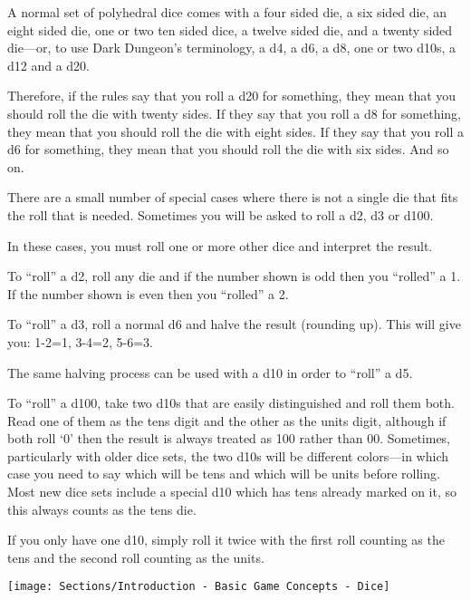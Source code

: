 \begin{multicols*}{2}
A normal set of polyhedral dice comes with a four sided die, a six sided die, an eight sided die, one or two ten sided dice, a twelve sided die, and a twenty sided die—or, to use Dark Dungeon’s terminology, a d4, a d6, a d8, one or two d10s, a d12 and a d20.

Therefore, if the rules say that you roll a d20 for something, they mean that you should roll the die with twenty sides. If they say that you roll a d8 for something, they mean that you should roll the die with eight sides. If they say that you roll a d6 for something, they mean that you should roll the die with six sides. And so on.

There are a small number of special cases where there is not a single die that fits the roll that is needed. Sometimes you will be asked to roll a d2, d3 or d100.

In these cases, you must roll one or more other dice and interpret the result.

To “roll” a d2, roll any die and if the number shown is odd then you “rolled” a 1. If the number shown is even then you “rolled” a 2.

To “roll” a d3, roll a normal d6 and halve the result (rounding up). This will give you: 1-2=1, 3-4=2, 5-6=3.

The same halving process can be used with a d10 in order to “roll” a d5.

To “roll” a d100, take two d10s that are easily distinguished and roll them both. Read one of them as the tens digit and the other as the units digit, although if both roll ‘0’ then the result is always treated as 100 rather than 00. Sometimes, particularly with older dice sets, the two d10s will be different colors—in which case you need to say which will be tens and which will be units before rolling. Most new dice sets include a special d10 which has tens already marked on it, so this always counts as the tens die.

If you only have one d10, simply roll it twice with the first roll counting as the tens and the second roll counting as the units.

\texttt{[image: Sections/Introduction - Basic Game Concepts - Dice]}

\end{multicols*}
